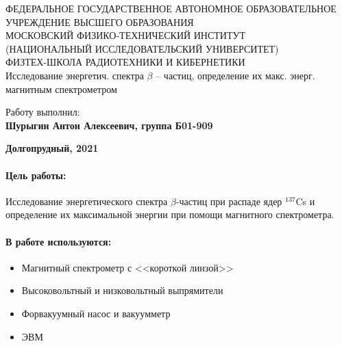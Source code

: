 \documentclass[15pt,a5paper,reqno]{article}
\begin{document}
\begin{center}
  {\small ФЕДЕРАЛЬНОЕ ГОСУДАРСТВЕННОЕ АВТОНОМНОЕ ОБРАЗОВАТЕЛЬНОЕ\\ УЧРЕЖДЕНИЕ ВЫСШЕГО ОБРАЗОВАНИЯ\\ МОСКОВСКИЙ ФИЗИКО-ТЕХНИЧЕСКИЙ ИНСТИТУТ\\ (НАЦИОНАЛЬНЫЙ ИССЛЕДОВАТЕЛЬСКИЙ УНИВЕРСИТЕТ)\\ ФИЗТЕХ-ШКОЛА РАДИОТЕХНИКИ И КИБЕРНЕТИКИ}\\
  \hfill \break
  \hfill \break
  \hfill \break
  \Huge{Исследование энергетич. спектра $\beta$ -- частиц, определение их макс. энерг. магнитным спектрометром}\\
\end{center}

\hfill \break
\hfill \break
\hfill \break
\hfill \break
\hfill \break
\hfill \break

\begin{flushright}
  \normalsize{Работу выполнил:}\\
  \normalsize{\textbf{Шурыгин Антон Алексеевич, группа Б01-909}}\\
\end{flushright}

\begin{center}
  \normalsize{\textbf{Долгопрудный, 2021}}
\end{center}


\thispagestyle{empty} %


\newpage
\thispagestyle{plain}
\tableofcontents
\thispagestyle{plain}
\newpage


\paragraph{Цель работы:}
Исследование энергетического спектра $\beta$-частиц при распаде ядер $^{137}$Cs и определение их максимальной энергии при помощи магнитного спектрометра. 

\paragraph
{В работе используются:}
\begin{itemize}
    \item Магнитный спектрометр с <<короткой линзой>>
    \item Высоковольтный и низковольтный выпрямители
    \item Форвакуумный насос и вакуумметр
    \item ЭВМ
\end{itemize}
\end{document}
